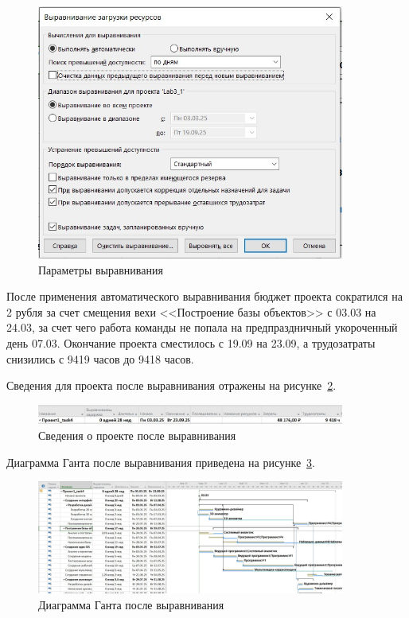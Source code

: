 \begin{figure}[H]
	\centering
	\includegraphics[width=0.9\textwidth]{img/lab3/task1/screen1.jpg}
	\caption{Параметры выравнивания}
	\label{fig:screen1}
\end{figure}

После применения автоматического выравнивания бюджет проекта сократился на 2 рубля за счет смещения вехи <<Построение базы объектов>> с 03.03 на 24.03, за счет чего работа команды не попала на предпраздничный укороченный день 07.03.
Окончание проекта сместилось с 19.09 на 23.09, а трудозатраты снизились с 9419 часов до 9418 часов.

Сведения для проекта после выравнивания отражены на рисунке~\ref{fig:screen2}.

\begin{figure}[H]
	\centering
	\includegraphics[width=0.9\textwidth]{img/lab3/task1/screen2.jpg}
	\caption{Сведения о проекте после выравнивания}
	\label{fig:screen2}
\end{figure}

Диаграмма Ганта после выравнивания приведена на рисунке~\ref{fig:screen3}.

\begin{figure}[H]
	\centering
	\includegraphics[width=0.9\textwidth]{img/lab3/task1/screen3.jpg}
	\caption{Диаграмма Ганта после выравнивания}
	\label{fig:screen3}
\end{figure}

